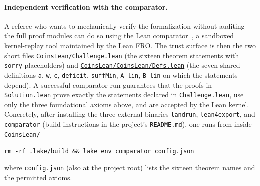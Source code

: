 \documentclass[reqno,final,11pt]{amsart}
\theoremstyle{plain}
\theoremstyle{definition}
\theoremstyle{remark}
\begin{document}
\paragraph{Independent verification with the comparator.}
A referee who wants to mechanically verify the formalization
without auditing the full proof modules can do so using the Lean
comparator~\citep{LeanComparator}, a sandboxed kernel-replay tool
maintained by the Lean FRO.  The trust surface is then the two
short files
\href{https://github.com/pfaffelh/coins/blob/main/CoinsLean/Challenge.lean}{\texttt{CoinsLean/\allowbreak Challenge.lean}}
(the sixteen theorem statements with \texttt{sorry} placeholders)
and
\href{https://github.com/pfaffelh/coins/blob/main/CoinsLean/CoinsLean/Defs.lean}{\texttt{CoinsLean/\allowbreak CoinsLean/\allowbreak Defs.lean}}
(the seven shared definitions \texttt{a}, \texttt{w}, \texttt{c},
\texttt{deficit}, \texttt{suffMin}, \texttt{A\_lin}, \texttt{B\_lin}
on which the statements depend).  A successful comparator run
guarantees that the proofs in
\href{https://github.com/pfaffelh/coins/blob/main/CoinsLean/Solution.lean}{\texttt{Solution.lean}}
prove exactly the statements declared in \texttt{Challenge.lean},
use only the three foundational axioms above, and are accepted by
the Lean kernel.  Concretely, after installing the three external
binaries \texttt{landrun}, \texttt{lean4export}, and
\texttt{comparator} (build instructions in the project's
\texttt{README.md}), one runs from inside \texttt{CoinsLean/}
\begin{center}
  \texttt{rm -rf .lake/build \&\& lake env comparator config.json}
\end{center}
where \texttt{config.json} (also at the project root) lists the
sixteen theorem names and the permitted axioms.
\end{document}
